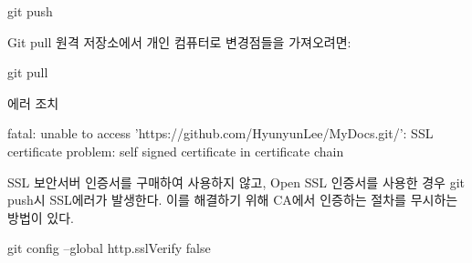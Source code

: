 git push

Git pull
원격 저장소에서 개인 컴퓨터로 변경점들을 가져오려면:

git pull





에러 조치

fatal: unable to access 'https://github.com/HyunyunLee/MyDocs.git/': SSL certificate problem: self signed certificate in certificate chain

SSL 보안서버 인증서를 구매하여 사용하지 않고, Open SSL 인증서를 사용한 경우 git push시 SSL에러가 발생한다.
이를 해결하기 위해 CA에서 인증하는 절차를 무시하는 방법이 있다.

git config --global http.sslVerify false
